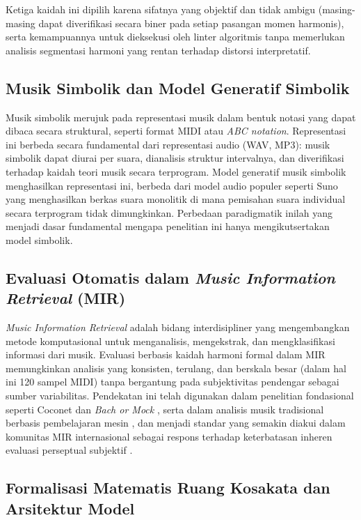 Ketiga kaidah ini dipilih karena sifatnya yang objektif dan tidak ambigu (masing-masing dapat diverifikasi secara biner pada setiap pasangan momen harmonis), serta kemampuannya untuk dieksekusi oleh linter algoritmis tanpa memerlukan analisis segmentasi harmoni yang rentan terhadap distorsi interpretatif.

\subsection{Musik Simbolik dan Model Generatif Simbolik}

Musik simbolik merujuk pada representasi musik dalam bentuk notasi yang dapat dibaca secara struktural, seperti format MIDI atau \textit{ABC notation}. Representasi ini berbeda secara fundamental dari representasi audio (WAV, MP3): musik simbolik dapat diurai per suara, dianalisis struktur intervalnya, dan diverifikasi terhadap kaidah teori musik secara terprogram. Model generatif musik simbolik menghasilkan representasi ini, berbeda dari model audio populer seperti Suno yang menghasilkan berkas suara monolitik di mana pemisahan suara individual secara terprogram tidak dimungkinkan. Perbedaan paradigmatik inilah yang menjadi dasar fundamental mengapa penelitian ini hanya mengikutsertakan model simbolik.

\subsection{Evaluasi Otomatis dalam \textit{Music Information Retrieval} (MIR)}

\textit{Music Information Retrieval} adalah bidang interdisipliner yang mengembangkan metode komputasional untuk menganalisis, mengekstrak, dan mengklasifikasi informasi dari musik. Evaluasi berbasis kaidah harmoni formal dalam MIR memungkinkan analisis yang konsisten, terulang, dan berskala besar (dalam hal ini 120 sampel MIDI) tanpa bergantung pada subjektivitas pendengar sebagai sumber variabilitas. Pendekatan ini telah digunakan dalam penelitian fondasional seperti Coconet \parencite{huang2017} dan \textit{Bach or Mock} \parencite{fang2020}, serta dalam analisis musik tradisional berbasis pembelajaran mesin \parencite{sturm2020}, dan menjadi standar yang semakin diakui dalam komunitas MIR internasional sebagai respons terhadap keterbatasan inheren evaluasi perseptual subjektif \parencite{yang2020, le2025}.

\subsection{Formalisasi Matematis Ruang Kosakata dan Arsitektur Model}

